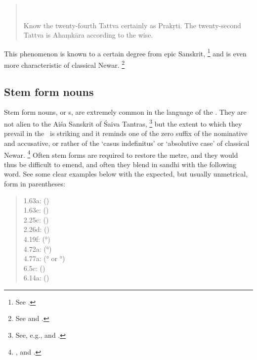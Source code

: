 \begin{quote}
\\

Know the twenty-fourth Tattva certainly as Prakṛti.
The twenty-second Tattva is Ahaṃkāra according to the wise.
\end{quote}

\noindent
This phenomenon is known to a certain degree
from epic Sanskrit,%
	\footnote{See .}
and is even more characteristic of classical Newar.%
		\footnote{See  and
									 .}





\subsection{Stem form nouns}\label{stemform}

Stem form nouns, or s, are extremely common in the
language of the \VSS. They are not alien to the Aiśa Sanskrit
of Śaiva Tantras,%
		\footnote{See, e.g.,  and
								.}
but the extent to which they prevail in the \VSS\ is striking and it
reminds one of the zero suffix of the nominative and accusative,
or rather of the `casus indefinitus' or `absolutive case' of classical Newar.%
		\footnote{,
		 and .} 
Often stem forms are required to restore the metre, 
and they would thus be difficult to emend,
and often they blend in sandhi with the following word. 
See some clear examples below with the expected, 
but usually unmetrical, form in parentheses:

\begin{quote}
 1.63a:  () \\
1.63c:  () \\
2.25c:  () \\
2.26d:  () \\
4.19f:  (°) \\
4.72a:  (°) \\
4.77a:  (° or °)
 \\
6.5c:  () \\
6.14a:  () \\
\end{quote}





